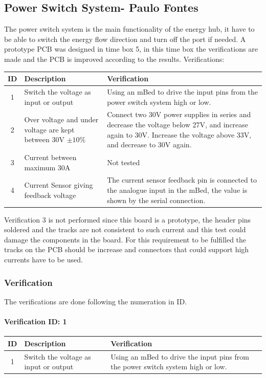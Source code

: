 \subsection{Power Switch System- Paulo Fontes}
The power switch system is the main functionality of the energy hub, it have to be able to switch the energy flow direction and turn off the port if needed. A prototype PCB was designed in time box 5, in this time box the verifications are made and the PCB is improved according to the results.
\p
Verifications:
\begin{table}[H]
\centering
	\begin{tabular}{| c | l | p{7cm} | }
		\hline
		ID & Description & Verification \\\hline
		1 & Switch the voltage as input or output & Using an mBed to drive the input pins from the power switch system high or low. \\\hline
		2 & Over voltage and under voltage are kept between 30V $ \pm10\% $ & Connect two 30V power supplies in series and decrease the voltage below 27V, and increase again to 30V. Increase the voltage above 33V, and decrease to 30V again. \\\hline
		3 & Current between maximum 30A & Not tested \\\hline
		4 & Current Sensor giving feedback voltage & The current sensor feedback pin is connected to the analogue input in the mBed, the value is shown by the serial connection. \\\hline
	\end{tabular}
\end{table}

Verification 3 is not performed since this board is a prototype, the header pins soldered and the tracks are not consistent to such current and this test could damage the components in the board. For this requirement to be fulfilled the tracks on the PCB should be increase and connectors that could support high currents have to be used.

\subsubsection{Verification}
The verifications are done following the numeration in ID.

\paragraph{Verification ID: 1}
\begin{table}[H]
\centering
	\begin{tabular}{| c | l | p{7cm} | }
		\hline
		ID & Description & Verification \\\hline
		1 & Switch the voltage as input or output & Using an mBed to drive the input pins from the power switch system high or low. \\\hline
	\end{tabular}
\end{table}

